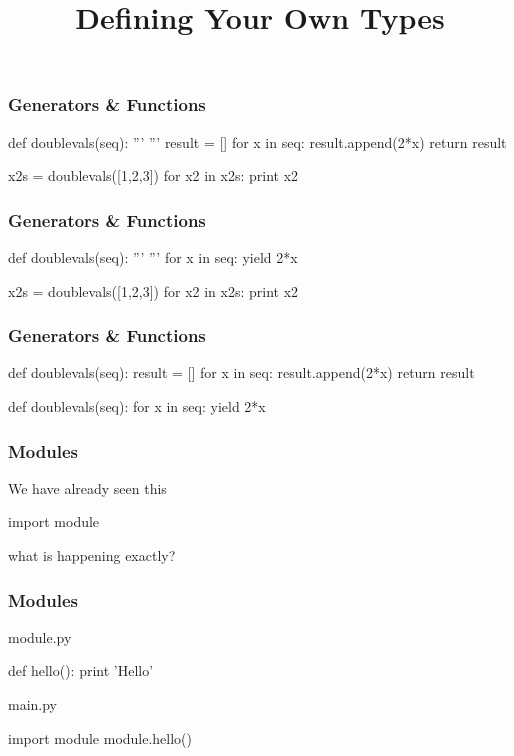 
\title[Python III]{Defining Your Own Types}


\frame{\maketitle}

\begin{frame}[fragile]
\frametitle{Generators \& Functions}
\begin{python}
def doublevals(seq):
    '''
    '''
    result = []
    for x in seq:
        result.append(2*x)
    return result

x2s = doublevals([1,2,3])
for x2 in x2s:
    print x2
\end{python}
\end{frame}

\begin{frame}[fragile]
\frametitle{Generators \& Functions}
\begin{python}
def doublevals(seq):
    '''
    '''
    for x in seq:
        yield 2*x

x2s = doublevals([1,2,3])
for x2 in x2s:
    print x2
\end{python}
\end{frame}

\begin{frame}[fragile]
\frametitle{Generators \& Functions}
\begin{python}
def doublevals(seq):
    result = []
    for x in seq:
        result.append(2*x)
    return result

def doublevals(seq):
    for x in seq:
        yield 2*x
\end{python}
\end{frame}

\begin{frame}[fragile]
\frametitle{Modules}
We have already seen this
\begin{python}
import module
\end{python}

what is happening exactly?
\end{frame}

\begin{frame}[fragile]
\frametitle{Modules}

\begin{block}{module.py}
\begin{python}
def hello():
    print 'Hello'
\end{python}
\end{block}

\begin{block}{main.py}
\begin{python}
import module
module.hello()
\end{python}
\end{block}

\end{frame}

